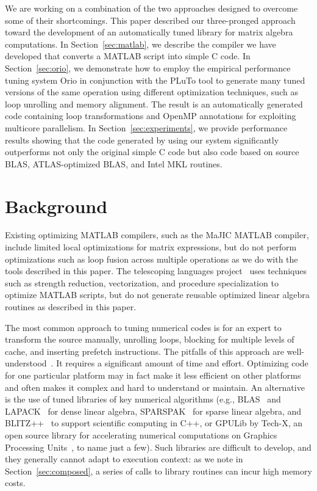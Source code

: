 \documentclass[11pt]{article}
\begin{document}
We are working on a combination of the two approaches designed to overcome some of their shortcomings.   This paper described our three-pronged approach toward the development of an automatically tuned library for matrix algebra computations.  In Section~\ref{sec:matlab}, we describe the compiler we have developed that converts a MATLAB script into simple C code. In Section~\ref{sec:orio}, we demonstrate how to employ the empirical performance tuning system Orio in conjunction with the PLuTo tool to generate many tuned versions of the same operation using different optimization techniques, such as loop unrolling and memory alignment.  The result is an automatically generated code containing loop transformations and OpenMP annotations for exploiting multicore parallelism. In Section~\ref{sec:experiments}, we provide performance results showing that the code generated by using our system significantly outperforms not only the original simple C code but also code based on source BLAS, ATLAS-optimized BLAS, and Intel MKL routines.

\section{Background}
\label{sec:background}

Existing optimizing MATLAB compilers, such as the MaJIC MATLAB compiler, include limited local optimizations for matrix expressions, but do not perform optimizations such as loop fusion across multiple operations as we do with the tools described in this paper. The telescoping languages project~\cite{telescopingurl,teleoverview,Ken99} uses techniques such as strength reduction, vectorization, and procedure specialization to optimize MATLAB scripts, but do not generate reusable optimized linear algebra routines as described in this paper.

The most common approach  to tuning numerical codes is for an expert to transform the source manually, unrolling loops, blocking for multiple levels of cache, and inserting prefetch instructions.  The pitfalls of this approach are well-understood~\cite{Goedecker01}.  It requires a significant amount of time and effort. Optimizing code for one particular platform may in fact make it less efficient on other platforms and often makes it complex and hard to understand or maintain.    An alternative is the use of tuned libraries of key numerical algorithms (e.g., BLAS~\cite{Dongarra:1990fk} and LAPACK~\cite{LAPACK} for dense linear algebra, SPARSPAK~\cite{sparspak} for sparse linear algebra, and BLITZ++~\cite{blitz} to support scientific computing in C++, or GPULib by Tech-X, an open source library for accelerating numerical computations on Graphics Processing Units~\cite{gpulib}, to name just a few). Such libraries are difficult to develop, and they generally cannot adapt to execution context: as we note in Section~\ref{sec:composed}, a series of calls to library routines can incur high memory costs.
\end{document}
